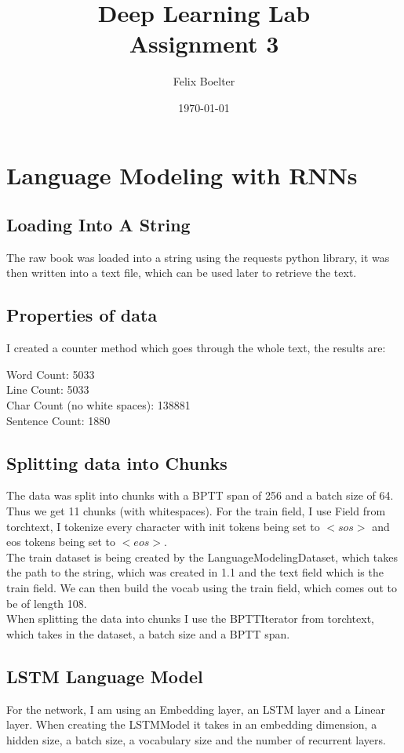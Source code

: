 \documentclass{article}
\title{\textbf{Deep Learning Lab}\\ Assignment 3}
\author{Felix Boelter}
\date{\today}
\begin{document}
\maketitle

\section{Language Modeling with RNNs}
\subsection{Loading Into A String}
The raw book was loaded into a string using the requests python library, it was then written into a text file, which can be used later to retrieve the text.
\subsection{Properties of data}
I created a counter method which goes through the whole text, the results are:
\begin{center}
Word Count:  5033\\
Line Count:  5033\\
Char Count (no white spaces):  138881\\
Sentence Count:  1880\\
\end{center}
\subsection{Splitting data into Chunks}
The data was split into chunks with a BPTT span of 256 and a batch size of 64. Thus we get 11 chunks (with whitespaces). For the train field, I use Field from torchtext, I tokenize every character with init tokens being set to $<sos>$ and eos tokens being set to $<eos>$.\\ The train dataset is being created by the LanguageModelingDataset, which takes the path to the string, which was created in 1.1 and the text field which is the train field. We can then build the vocab using the train field, which comes out to be of length 108.\\ When splitting the data into chunks I use the BPTTIterator from torchtext, which takes in the dataset, a batch size and a BPTT span.
\subsection{LSTM Language Model}
For the network, I am using an Embedding layer, an LSTM layer and a Linear layer. When creating the LSTMModel it takes in an embedding dimension, a hidden size, a batch size, a vocabulary size and the number of recurrent layers.
\end{document}
